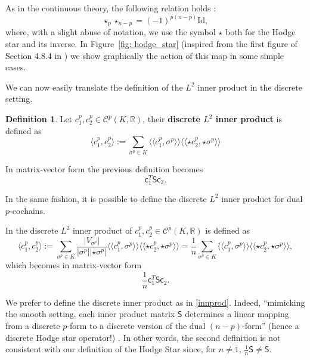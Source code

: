 \documentclass{article}
\theoremstyle{definition} %
\newtheorem{Def}{Definition}
\theoremstyle{plain} %
\theoremstyle{remark} %
\newcommand{\rr}{\mathbb{R}}
\newcommand{\llangle}{\langle \langle}
\newcommand{\rrangle}{\rangle \rangle}
\begin{document}
As in the continuous theory, the following relation holds \cite{grinspun2006discrete}:
\begin{equation}
    \star_p \star_{n-p} = (-1)^{p(n-p)} \text{Id},
\end{equation}
where, with a slight abuse of notation, we use the symbol $\star$ both for the Hodge star and its inverse. In Figure~\ref{fig: hodge_star} (inspired from the first figure of Section 4.8.4 in \cite{crane2018discrete}) we show graphically the action of this map in some simple cases.

We can now easily translate the definition of the $L^2$ inner product in the discrete setting.

\begin{Def}
    Let $c_1^p, c^p_2 \in \mathcal{C}^p(K, \rr)$, their \textbf{discrete $L^2$ inner product} is defined as 
        \begin{equation}
            \langle c_1^p, c_2^{p} \rangle := \sum_{\sigma^p \in K} \llangle c_1^p, \sigma^p \rrangle \llangle \star c_2^{p}, \star \sigma^p \rrangle \label{innprod}
        \end{equation}
\end{Def}

In matrix-vector form the previous definition becomes
\begin{equation}
    \mathsf{c}^T_1 \mathsf{S} \mathsf{c}_2.
\end{equation}

In the same fashion, it is possible to define the discrete $L^2$ inner product for dual $p$-cochains.

In \cite{desbrun2005discrete} the discrete $L^2$ inner product of $c_1^p, c^p_2 \in \mathcal{C}^p(K, \rr)$ is defined as 
\begin{equation}
    \langle c_1^p, c_2^{p} \rangle := \sum_{\sigma^p \in K} \frac{|V_{\sigma^p}|}{|\sigma^p||\star \sigma^p|} \llangle c_1^p, \sigma^p \rrangle \llangle \star c_2^{p}, \star \sigma^p \rrangle = \frac{1}{n} \sum_{\sigma^p \in K} \llangle c_1^p, \sigma^p \rrangle \llangle \star c_2^{p}, \star \sigma^p \rrangle,
\end{equation}
which becomes in matrix-vector form
\begin{equation}
    \frac{1}{n}\mathsf{c}^T_1 \mathsf{S} \mathsf{c}_2.
\end{equation}

We prefer to define the discrete inner product as in \eqref{innprod}. Indeed, ``mimicking the smooth setting, each inner product matrix $\mathsf{S}$ determines a linear mapping from a discrete
$p$-form to a discrete version of the dual $(n-p)$-form'' (hence a discrete Hodge star operator!) \cite{de2016subdivision}. In other words, the second definition is not consistent with our definition of the Hodge Star since, for $n \neq 1$, $\frac{1}{n} \mathsf{S} \neq \mathsf{S}$.
\end{document}

